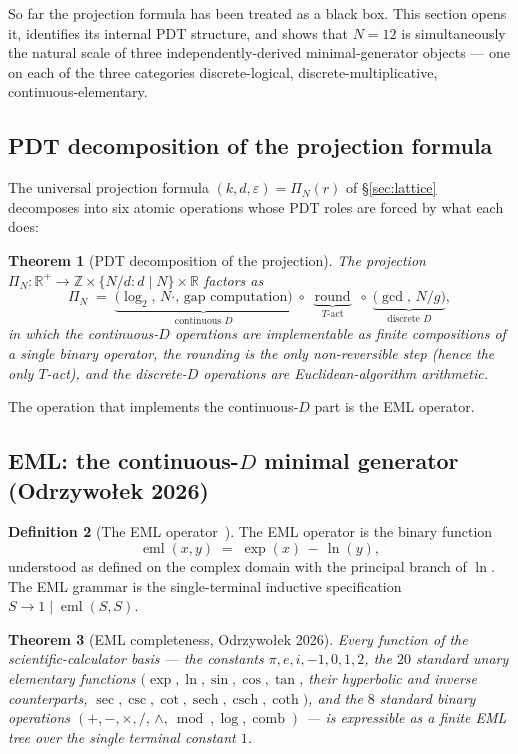 \documentclass[11pt,a4paper]{article}
\newtheorem{theorem}{Theorem}[section]
\theoremstyle{definition}
\newtheorem{definition}[theorem]{Definition}
\theoremstyle{remark}
\newcommand{\R}{\mathbb{R}}
\newcommand{\Z}{\mathbb{Z}}
\DeclareMathOperator{\round}{round}
\begin{document}
So far the projection formula has been treated as a black box. This section opens it, identifies its internal PDT structure, and shows that $N=12$ is simultaneously the natural scale of three independently-derived minimal-generator objects --- one on each of the three categories discrete-logical, discrete-multiplicative, continuous-elementary.

\subsection{PDT decomposition of the projection formula}\label{subsec:pdt-decomp}

The universal projection formula $(k,d,\varepsilon) = \Pi_{N}(r)$ of \S\ref{sec:lattice} decomposes into six atomic operations whose PDT roles are forced by what each does:

\begin{theorem}[PDT decomposition of the projection]\label{thm:pdt-decomp}
The projection $\Pi_{N}:\R^{+}\to\Z\times\{N/d : d\mid N\}\times\R$ factors as
\[
\Pi_{N} \;=\; \underbrace{\bigl(\log_{2},\, N\cdot,\, \text{gap computation}\bigr)}_{\text{continuous $D$}} \;\circ\; \underbrace{\round}_{T\text{-act}} \;\circ\; \underbrace{\bigl(\gcd,\, N/g\bigr)}_{\text{discrete $D$}},
\]
in which the continuous-$D$ operations are implementable as finite compositions of a single binary operator, the rounding is the only non-reversible step (hence the only $T$-act), and the discrete-$D$ operations are Euclidean-algorithm arithmetic.
\end{theorem}

The operation that implements the continuous-$D$ part is the EML operator.

\subsection{EML: the continuous-$D$ minimal generator (Odrzywołek 2026)}\label{subsec:eml}

\begin{definition}[The EML operator~\cite{Odrzywolek2026}]\label{def:eml}
The EML operator is the binary function
\[
\operatorname{eml}(x,y) \;=\; \exp(x)\,-\,\ln(y),
\]
understood as defined on the complex domain with the principal branch of $\ln$. The EML grammar is the single-terminal inductive specification $S\to 1 \mid \operatorname{eml}(S,S)$.
\end{definition}

\begin{theorem}[EML completeness, Odrzywołek 2026]\label{thm:eml-complete}
Every function of the scientific-calculator basis --- the constants $\pi,e,i,-1,0,1,2$, the $20$ standard unary elementary functions $(\exp,\ln,\sin,\cos,\tan$, their hyperbolic and inverse counterparts, $\sec,\csc,\cot,\operatorname{sech},\operatorname{csch},\operatorname{coth})$, and the $8$ standard binary operations $(+,-,\times,/,\,\wedge,\bmod,\log,\operatorname{comb})$ --- is expressible as a finite EML tree over the single terminal constant $1$.
\end{theorem}
\end{document}
